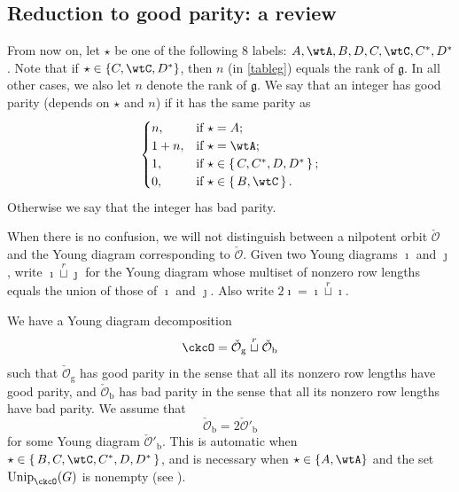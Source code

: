 \documentclass[11pt,a4paper]{amsart}
\newcommand{\CO}{{\mathcal {O}}}
\newcommand{\g}{\mathfrak g}
\newcommand{\be}{\begin {equation}}
\newcommand{\ee}{\end {equation}}
\numberwithin{equation}{section}
\theoremstyle{remark}
\def\Unip{\mathrm{Unip}}
\begin{document}
\subsection{Reduction to good parity: a review}\label{subsec:red}
From now on, let $\star$ be one of the following 8 labels: $A, \wtA, B, D, C, \wtC, C^{*}, D^{*}$. Note that if $\star\in \{C, \wtC, D^*\}$, then $n$ (in \eqref{tableg}) equals the rank of $\g$. In all other cases, we also let $n$ denote the rank of $\g$.
We say that an integer has good parity (depends on $\star$ and $n$) if it has the same parity as
\begin{equation}\label{parity}
  \begin{cases}
    n, &  \text{if $\star =A$}; \\
    1+ n, &  \text{if $\star = \wtA$}; \\
   1, & \text{if } \star \in \set{C,C^{*},D,D^{*}};\\
 \text{0}, & \text{if } \star \in \set{B,\wtC}.\\
  \end{cases}
\end{equation}
Otherwise we say that the integer has bad parity.


When there is no confusion, we will not distinguish between a nilpotent orbit $\check \CO$ and  the Young diagram corresponding to $\check \CO$. Given two Young diagrams $\imath$ and $\jmath$, write $\imath \stackrel{r}{\sqcup} \jmath$ for
the Young diagram whose multiset of nonzero row lengths equals the union of
those of $\imath$ and $\jmath$. Also write $2\imath =\imath \stackrel{r}{\sqcup} \imath$. 

We have a Young diagram decomposition 
\begin{equation*} %
     \ckcO=\check \CO_\mathrm g  \stackrel{r}{\sqcup} \check \CO_\mathrm b
\end{equation*}
 such that $\check \CO_\mathrm g$ has good parity in the sense that all its nonzero row lengths  have good parity,  and $\check \CO_\mathrm b$ has bad parity in the sense that all its nonzero row lengths  have bad parity.
 We assume that
 \be\label{doubleco}
 \check \CO_\mathrm b =2 \check \CO'_\mathrm b 
 \ee
 for some Young diagram $\check \CO'_\mathrm b$. This is automatic when  $\star\in \set{B, C,\wtC, C^{*},D,D^{*}}$, and is necessary when $\star \in\{A, \wtA\}$ and the set $\Unip_{\ckcO}(G)$ is nonempty (see \cite[Theorem 2.16]{BMSZa}).
 
\end{document}
